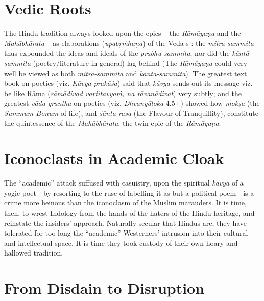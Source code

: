 \section*{Vedic Roots}

The Hindu tradition always looked upon the epics -- the {\sl Rāmāyaṇa} and the {\sl Mahābhārata} -- as elaborations ({\sl upabṛṁhaṇa}) of the Veda-s : the {\sl mitra-sammita} thus expounded the ideas and ideals  of the {\sl prabhu-\break\-sammita}; nor did the {\sl kāntā-sammita} (poetry/literature in general) lag behind (The {\sl Rāmāyaṇa} could very well be viewed as both {\sl mitra-sammita} and {\sl kāntā-sammita}). The greatest text book on poetics (viz. {\sl Kāvya-prakāśa}) said that {\sl kāvya} sends out its message viz. be like Rāma ({\sl rāmādivad vartitavyaṁ, na rāvaṇādivat}) very subtly; and the greatest {\sl vāda-grantha} on poetics (viz. {\sl Dhvanyāloka} 4.5+) showed how {\sl mokṣa} (the {\sl Summum Bonum} of life), and {\sl śānta-rasa} (the Flavour of Tranquillity), constitute the quintessence of the {\sl Mahābhārata}, the twin epic of the {\sl Rāmāyaṇa}.\\[-20pt]

\section*{Iconoclasts in Academic Cloak}

The “academic” attack suffused with casuistry, upon the spiritual {\sl kāvya} of a yogic poet - by resorting to the ruse of labelling it as but a political poem - is a crime more heinous than the iconoclasm of the Muslim marauders. It is time, then, to wrest Indology from the hands of the haters of the Hindu heritage, and reinstate the insiders’ approach. Naturally secular that Hindus are, they have  tolerated for too long the “academic” Westerners’ intrusion into their cultural and intellectual space. It is time they took custody of their own hoary and hallowed tradition.\\[-20pt] 

\section*{From Disdain to Disruption}

